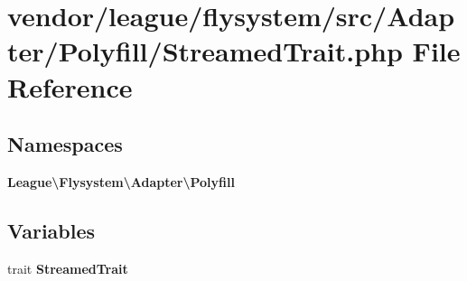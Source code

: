 \section{vendor/league/flysystem/src/\+Adapter/\+Polyfill/\+Streamed\+Trait.php File Reference}
\label{_streamed_trait_8php}
\subsection*{Namespaces}
\begin{DoxyCompactItemize}
\item 
 {\bf League\textbackslash{}\+Flysystem\textbackslash{}\+Adapter\textbackslash{}\+Polyfill}
\end{DoxyCompactItemize}
\subsection*{Variables}
\begin{DoxyCompactItemize}
\item 
trait {\bf Streamed\+Trait}
\end{DoxyCompactItemize}
